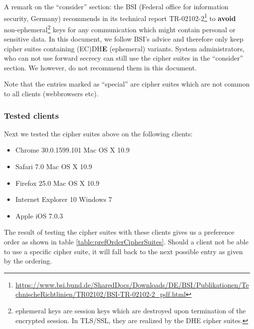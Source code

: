 A remark on the ``consider'' section: the BSI (Federal office for information security, Germany) recommends in its technical report TR-02102-2\footnote{\url{https://www.bsi.bund.de/SharedDocs/Downloads/DE/BSI/Publikationen/TechnischeRichtlinien/TR02102/BSI-TR-02102-2_pdf.html}} to \textbf{avoid} non-ephemeral\footnote{ephemeral keys are session keys which are destroyed upon termination of the encrypted session. In TLS/SSL, they are realized by the DHE cipher suites. } keys for any communication which might contain personal or sensitive data. In this document, we follow BSI's advice and therefore only keep cipher suites containing (EC)DH\textbf{E} (ephemeral) variants. System administrators, who can not use forward secrecy can still use the cipher suites in the ``consider'' section. We however, do not recommend them in this document.


Note that the entries marked as ``special'' are cipher suites which are not common to all clients (webbrowsers etc).


\subsubsection{Tested clients}
 
Next we tested the cipher suites above on the following clients:

\begin{itemize}
\item Chrome 30.0.1599.101 Mac OS X 10.9
\item Safari 7.0 Mac OS X 10.9
\item Firefox 25.0 Mac OS X 10.9
\item Internet Explorer 10 Windows 7
\item Apple iOS 7.0.3
\end{itemize}


The result of testing the cipher suites with these clients gives us a preference order as shown in table \ref{table:prefOrderCipherSuites}. 
Should a client not be able to use a specific cipher suite, it will fall back to the next possible entry as given by the ordering.

